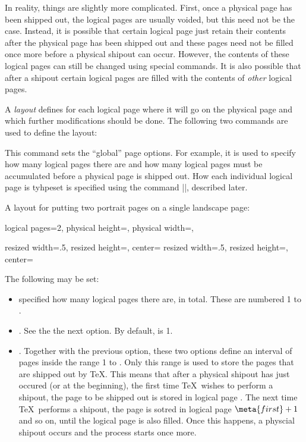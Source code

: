 In reality, things are slightly more complicated. First, once a
physical page has been shipped out, the logical pages are usually
voided, but this need not be the case. Instead, it is possible that
certain logical page just retain their contents after the physical
page has been shipped out and these pages need not be filled once more
before a physical shipout can occur. However, the contents of these
logical pages can still be changed using special commands. It is also
possible that after a shipout certain logical pages are filled with
the contents of \emph{other} logical pages.

A \emph{layout} defines for each logical page where it will go on the
physical page and which further modifications should be done. The
following two commands are used to define the layout:

\begin{command}{\pgfpageoptions{}}
  This command sets the ``global'' page options. For example, it is
  used to specify how many logical pages there are and how many
  logical pages must be accumulated before a physical page is shipped
  out. How each individual logical page is tyhpeset is specified using
  the command |\pgfsetuppage|, described later.

  \example A layout for putting two portrait pages on a single
  landscape page:
\begin{codeexample}
\pgfpagesoptions
{%
  logical pages=2,%
  physical height=\paperwidth,%
  physical width=\paperheight,%
}

{%
  resized width=.5\pgfphysicalwidth,%
  resized height=\pgfphysicalheight,%
  center=\pgfpoint{.25\pgfphysicalwidth}{.5\pgfphysicalheight}%
}%
{%
  resized width=.5\pgfphysicalwidth,%
  resized height=\pgfphysicalheight,%
  center=\pgfpoint{.75\pgfphysicalwidth}{.5\pgfphysicalheight}%
}%
\end{codeexample}

  The following  may be set:
  \begin{itemize}
    \item {} specified how many
    logical pages there are, in total. These are numbered 1 to
    .
    \item {}. See the the
      next option. By default,  is 1.
    \item {}. Together
    with the previous option, these two options define an interval of
    pages inside the range 1 to . Only this range
    is used to store the pages that are shipped out by \TeX. This
    means that after a physical shipout has just occured (or at the
    beginning), the first time \TeX\ wishes to perform a shipout, the
    page to be shipped out is stored in logical page . The
    next time \TeX\ performs a shipout, the page is sotred in logical
    page $\meta{first} +1$ and so on, until the logical page
     is also filled. Once this happens, a physcial shipout
    occurs and the process starts once more.


\end{itemize}
\end{command}
